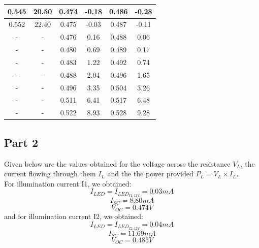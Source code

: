 \documentclass[12pt]{article}
\begin{document}
\begin{center}
\begin{tabular}{|| c c | c c | c c ||}
0.545 & 20.50 & 0.474 & -0.18 & 0.486 & -0.28 \\ \hline
0.552 & 22.40 & 0.475 & -0.03 & 0.487 & -0.11 \\ \hline
- & - & 0.476 & 0.16 & 0.488 & 0.06 \\ \hline
- & - & 0.480 & 0.69 & 0.489 & 0.17 \\ \hline
- & - & 0.483 & 1.22 & 0.492 & 0.74 \\ \hline
- & - & 0.488 & 2.04 & 0.496 & 1.65 \\ \hline
- & - & 0.496 & 3.35 & 0.504 & 3.26 \\ \hline
- & - & 0.511 & 6.41 & 0.517 & 6.48 \\ \hline
- & - & 0.522 & 8.93 & 0.528 & 9.28 \\ \hline
\end{tabular}
\end{center}

\subsection{Part 2}

Given below are the values obtained for the voltage across the resistance \( V_L \), the current flowing through them \( I_L \) and the the power provided \( P_L = V_L \times I_L \).\\
For illumination current I1, we obtained: \[ I_{LED} = I_{LED_{I1, 12V}} = 0.03 mA\] \[I_{SC} = 8.80 mA\] \[V_{OC} = 0.474 V\] and for illumination current I2, we obtained: \[ I_{LED} = I_{LED_{I2, 12V}} = 0.04 mA\] \[I_{SC} = 11.69 mA\] \[V_{OC} = 0.485 V\]
\end{document}
